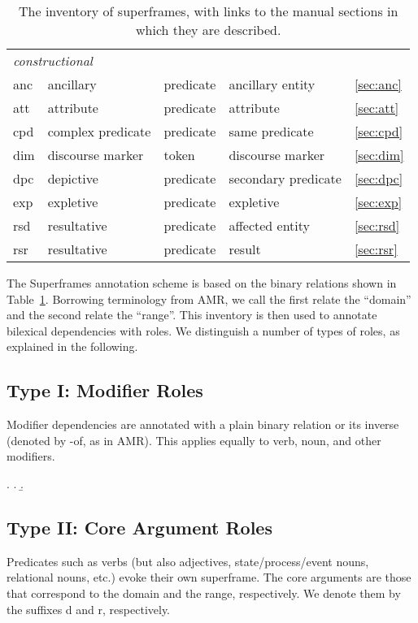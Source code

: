 \documentclass[a4paper]{article}
\begin{document}
\begin{table}
\begin{tabular}{lllll}
        \midrule
        \multicolumn{4}{l}{\emph{constructional}} \\
        anc & ancillary & predicate & ancillary entity & \ref{sec:anc} \\
        att & attribute & predicate & attribute & \ref{sec:att} \\
        cpd & complex predicate & predicate & same predicate & \ref{sec:cpd} \\
        dim & discourse marker & token & discourse marker & \ref{sec:dim} \\
        dpc & depictive & predicate & secondary predicate & \ref{sec:dpc}\\
        exp & expletive & predicate & expletive & \ref{sec:exp} \\
        rsd & resultative & predicate & affected entity & \ref{sec:rsd} \\
        rsr & resultative & predicate & result & \ref{sec:rsr} \\
        \bottomrule
    \end{tabular}
    \caption{The inventory of superframes, with links to the manual sections in which they are described.}
    \label{tab:inventory}
\end{table}

The Superframes annotation scheme is based on the binary relations shown in Table~\ref{tab:inventory}. Borrowing terminology from AMR, we call the first relate the ``domain'' and the second relate the ``range''. This inventory is then used to annotate bilexical dependencies with roles. We distinguish a number of types of roles, as explained in the following.

\subsection{Type I: Modifier Roles}

Modifier dependencies are annotated with a plain binary relation or its inverse (denoted by \textsf{-of}, as in AMR). This applies equally to verb, noun, and other modifiers.

\ex. \a. 
     \b. 

\subsection{Type II: Core Argument Roles}

Predicates such as verbs (but also adjectives, state/process/event nouns, relational nouns, etc.) evoke their own superframe. The core arguments are those that correspond to the domain and the range, respectively. We denote them by the suffixes \textsf{d} and \textsf{r}, respectively.
\end{document}
